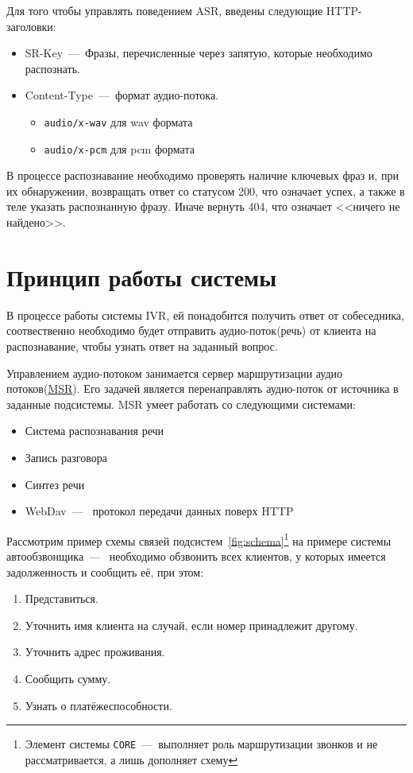 Для того чтобы управлять поведением ASR, введены следующие HTTP-заголовки:
\begin{itemize}
    \item SR-Key~---~Фразы, перечисленные через запятую, которые необходимо распознать.
    \item Content-Type~---~формат аудио-потока.
    \begin{itemize}
        \item {\tt audio/x-wav} для wav формата
        \item {\tt audio/x-pcm} для pcm формата
    \end{itemize}
\end{itemize}

В процессе распознавание необходимо проверять наличие ключевых фраз и, при их
обнаружении, возвращать ответ со статусом 200, что означает успех, а также в теле
указать распознанную фразу. Иначе вернуть 404, что означает <<ничего не найдено>>.

\section{Принцип работы системы}
В процессе работы системы IVR, ей понадобится получить ответ от собеседника,
соотвественно необходимо будет отправить аудио-поток(речь) от клиента на распознавание,
чтобы узнать ответ на заданный вопрос.

Управлением аудио-потоком занимается сервер маршрутизации аудио \mbox{потоков}(\hyperlink{msr}{MSR}).
Его задачей является перенаправлять аудио-поток от источника в заданные подсистемы.
MSR умеет работать со следующими системами:
\begin{itemize}
    \item Система распознавания речи
    \item Запись разговора
    \item Синтез речи
    \item WebDav~---~ протокол передачи данных поверх HTTP
\end{itemize}

Рассмотрим пример схемы связей подсистем~\ref{fig:schema}\footnote{Элемент системы
\texttt{CORE}~---~выполняет роль маршрутизации звонков и не рассматривается, а лишь
дополняет схему} на примере
системы автообзвонщика~---~ необходимо обзвонить всех клиентов, у которых имеется
задолженность и сообщить её, при этом:
\begin{enumerate}
    \item Представиться.
    \item Уточнить имя клиента на случай, если номер принадлежит другому.
    \item Уточнить адрес проживания.
    \item Сообщить сумму.
    \item Узнать о платёжеспособности.
\end{enumerate}

